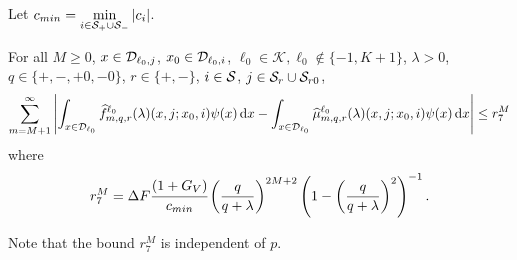 
Let \(c_{min} = \min\limits_{i\in\mathcal S_{+}\cup\mathcal{S}_-} |c_i|\).
\begin{lem}\label{lem: gkjljklgagjklagsjlk}For all \(M\geq 0\), \(x\in\mathcal{D}_{\ell_0,j}\), \(x_0\in\mathcal{D}_{\ell_0,i}\), \(\ell_0\in\mathcal K, \ell_0\notin\{-1,K+1\}\), \(\lambda > 0\), \(q\in\{+,-,+0,-0\}\), \(r\in\{+,-\}\), \(i\in\mathcal{S}\), \(j\in\mathcal{S}_r\cup\mathcal{S}_{r0}\),
	\begin{align}
		\sum_{m=M+1}^\infty \left| \int_{x\in\mathcal{D}_{\ell_0}} \widehat f^{\ell_0}_{m,q,r}(\lambda)(x,j;x_0,i)\psi(x)\, \mathrm{d} x
		-
		\int_{x\in\mathcal{D}_{\ell_0}} \widehat \mu^{\ell_0}_{m,q,r}(\lambda)(x,j;x_0,i)\psi(x) \, \mathrm{d} x\right| \leq r_7^M
	\end{align}
	where 
	\[r_7^M =  \Delta F\cfrac{(1+G_V)}{c_{min}}\left(\frac{q}{q+\lambda}\right)^{2M+2} \left(1-\left(\frac{q}{q+\lambda}\right)^2\right)^{-1} .\]
\end{lem}
Note that the bound \(r_7^M\) is independent of \(p\). 

